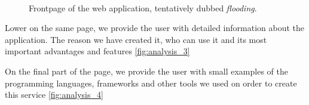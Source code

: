 \begin{figure}[p]
  \myfloatalign
   \quad
   \quad
   \\
 \caption{Frontpage of the web application, tentatively dubbed \textit{flooding}.}
 \label{fig:analysis_frontpage}
\end{figure}

Lower on the same page, we provide the user with detailed information about the application. The reason we have created it, who can use it and its most important advantages and features \autoref{fig:analysis_3}

On the final part of the page, we provide the user with small examples of the programming languages, frameworks and other tools we used on order to create this service 
\autoref{fig:analysis_4}

